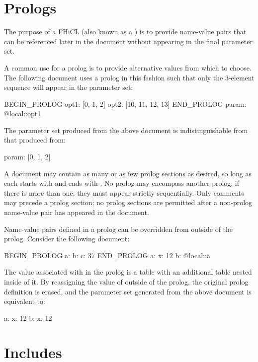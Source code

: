\documentclass{memarticle}
\newcommand{\fhicl}{FHiCL\xspace}
\begin{document}
\chapter{Prologs}
\label{sec:prologs}

The purpose of a \fhicl {} (also known as a ) is to provide name-value pairs that can be referenced
later in the document without appearing in the final parameter set.

A common use for a prolog is to provide alternative values from which
to choose.  The following document uses a prolog in this fashion such
that only the 3-element sequence will appear in the parameter set:
%
\Needspace{0.84in}
\begin{fcllisting}[texcl,escapechar=`]
BEGIN_PROLOG
  opt1: [0, 1, 2]
  opt2: [10, 11, 12, 13]
END_PROLOG
param: @local::opt1
\end{fcllisting}
%
The parameter set produced from the above document is
indistinguishable from that produced from:
%
\Needspace{0.17in}
\begin{fcllisting}[texcl,escapechar=`]
param: [0, 1, 2]
\end{fcllisting}

A document may contain as many or as few prolog sections as desired,
so long as each starts with  and ends with
.  No prolog may encompass another prolog; if
there is more than one, they must appear strictly sequentially.  Only
comments may precede a prolog section; no prolog sections are
permitted after a non-prolog name-value pair has appeared in the
document.

Name-value pairs defined in a prolog can be overridden from outside of
the prolog.  Consider the following document:
\Needspace{0.34in}
\begin{fcllisting}[texcl,escapechar=`]
BEGIN_PROLOG
a: { b: { c: 37 } }
END_PROLOG
a: { x: 12 }
b: @local::a
\end{fcllisting}
%
The value associated with  in the prolog is a table with an
additional table nested inside of it.  By reassigning the value of
 outside of the prolog, the original prolog definition is
erased, and the parameter set generated from the above document is
equivalent to:
%
\Needspace{0.34in}
\begin{fcllisting}[texcl,escapechar=`]
a: { x: 12 }
b: { x: 12 }
\end{fcllisting}

\chapter{Includes}
\end{document}
